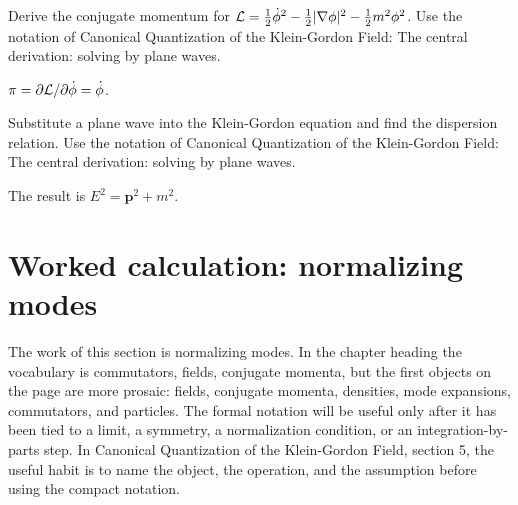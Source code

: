 \begin{exercise}
Derive the conjugate momentum for \(\mathcal L=\frac12\dot\phi^2-\frac12|\nabla\phi|^2-\frac12m^2\phi^2\).  Use the notation of Canonical Quantization of the Klein-Gordon Field: The central derivation: solving by plane waves.
\begin{answer}
\(\pi=\partial\mathcal L/\partial\dot\phi=\dot\phi\).
\end{answer}
\end{exercise}

\begin{exercise}
Substitute a plane wave into the Klein-Gordon equation and find the dispersion relation.  Use the notation of Canonical Quantization of the Klein-Gordon Field: The central derivation: solving by plane waves.
\begin{answer}
The result is \(E^2=\bm p^2+m^2\).
\end{answer}
\end{exercise}



\section{Worked calculation: normalizing modes}













The work of this section is normalizing modes.  In the chapter heading the vocabulary is commutators, fields, conjugate momenta, but the first objects on the page are more prosaic: fields, conjugate momenta, densities, mode expansions, commutators, and particles.  The formal notation will be useful only after it has been tied to a limit, a symmetry, a normalization condition, or an integration-by-parts step.  In Canonical Quantization of the Klein-Gordon Field, section 5, the useful habit is to name the object, the operation, and the assumption before using the compact notation.

